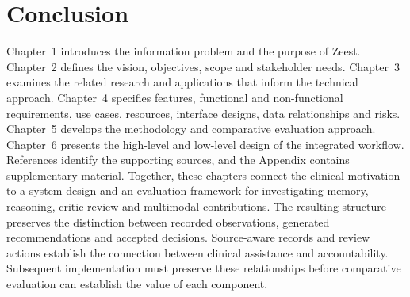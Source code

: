 
\section{Conclusion}

Chapter~1 introduces the information problem and the purpose of Zeest. Chapter~2 defines the vision, objectives, scope and stakeholder needs. Chapter~3 examines the related research and applications that inform the technical approach. Chapter~4 specifies features, functional and non-functional requirements, use cases, resources, interface designs, data relationships and risks. Chapter~5 develops the methodology and comparative evaluation approach. Chapter~6 presents the high-level and low-level design of the integrated workflow. References identify the supporting sources, and the Appendix contains supplementary material. Together, these chapters connect the clinical motivation to a system design and an evaluation framework for investigating memory, reasoning, critic review and multimodal contributions. The resulting structure preserves the distinction between recorded observations, generated recommendations and accepted decisions. Source-aware records and review actions establish the connection between clinical assistance and accountability. Subsequent implementation must preserve these relationships before comparative evaluation can establish the value of each component.

\endgroup
